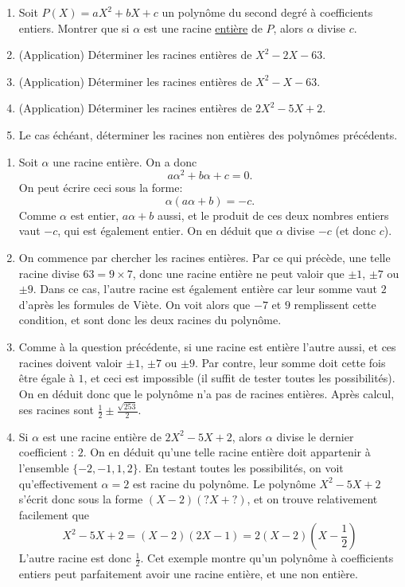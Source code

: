 \begin{exo}
\begin{enumerate}
\item Soit $P(X) = aX^2+bX+c$ un polynôme du second degré à coefficients entiers. Montrer que si $\alpha$ est une racine \underline{entière} de $P$, alors $\alpha$ divise $c$.
\item (Application) Déterminer les racines entières de $X^2-2X-63$.
\item (Application) Déterminer les racines entières de $X^2-X-63$.
\item (Application) Déterminer les racines entières de $2X^2-5X+2$.
\item Le cas échéant, déterminer les racines non entières des polynômes précédents.
\end{enumerate}
\begin{sol}
\begin{enumerate}
\item Soit $\alpha$ une racine entière. On a donc
\[a\alpha^2+b\alpha+c=0.\]
On peut écrire ceci sous la forme:
\[\alpha(a\alpha+b)=-c.\]
Comme $\alpha$ est entier, $a\alpha+b$ aussi, et le produit de ces deux nombres entiers vaut $-c$, qui est également entier. On en déduit que $\alpha$ divise $-c$ (et donc $c$).


\item On commence par chercher les racines entières. Par ce qui précède, une telle racine divise $63 = 9\times 7$, donc une racine entière ne peut valoir que $\pm 1$, $\pm 7$ ou $\pm 9$. Dans ce cas, l'autre racine est également entière car leur somme vaut $2$ d'après les formules de Viète. On voit alors que $-7$ et $9$ remplissent cette condition, et sont donc les deux racines du polynôme.
\item Comme à la question précédente, si une racine est entière l'autre aussi, et ces racines doivent valoir $\pm 1$, $\pm 7$ ou $\pm 9$. Par contre, leur somme doit cette fois être égale à $1$, et ceci est impossible (il suffit de tester toutes les possibilités). On en déduit donc que le polynôme n'a pas de racines entières. Après calcul, ses racines sont $\frac12 \pm \frac{\sqrt{253}}{2}$.
\item Si $\alpha$ est une racine entière de $2X^2-5X+2$, alors $\alpha$ divise le dernier coefficient : $2$. On en déduit qu'une telle racine entière doit appartenir à l'ensemble $\{-2,-1,1,2\}$. En testant toutes les possibilités, on voit qu'effectivement $\alpha=2$ est racine du polynôme. Le polynôme $X^2-5X+2$ s'écrit donc sous la forme $(X-2)(?X+?)$, et on trouve relativement facilement que 
\[
X^2-5X+2 = (X-2)(2X-1) = 2(X-2)(X-\frac{1}{2})\]
L'autre racine est donc $\frac12$. Cet exemple montre qu'un polynôme à coefficients entiers peut parfaitement avoir une racine entière, et une non entière.
\end{enumerate}
\end{sol}
\end{exo}



